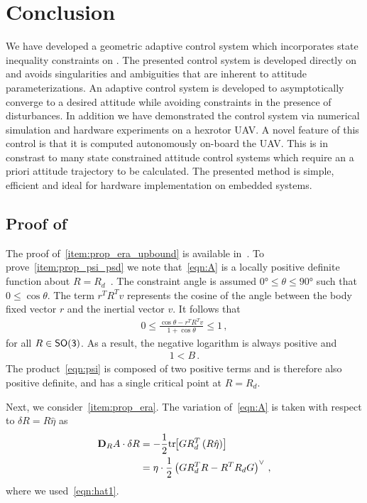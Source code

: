 \documentclass[letterpaper, 10 pt, conference]{ieeeconf}  %
\begin{document}
\section{Conclusion}\label{sec:conclusion}
We have developed a geometric adaptive control system which incorporates state inequality constraints on \SO.
The presented control system is developed directly on \SO and avoids singularities and ambiguities that are inherent to attitude parameterizations.
An adaptive control system is developed to asymptotically converge to a desired attitude while avoiding constraints in the presence of disturbances.
In addition we have demonstrated the control system via numerical simulation and hardware experiments on a hexrotor UAV.
A novel feature of this control is that it is computed autonomously on-board the UAV.
This is in constrast to many state constrained attitude control systems which require an a priori attitude trajectory to be calculated. 
The presented method is simple, efficient and ideal for hardware implementation on embedded systems.



\appendix
\subsection{Proof of~}\label{proof:config_error}
The proof of~\cref{item:prop_era_upbound} is available in~\cite{lee2011a}.
To prove~\cref{item:prop_psi_psd} we note that~\cref{eqn:A} is a locally positive definite function about \( R = R_d \)~\cite{bullo2004}.
The constraint angle is assumed \( \ang{0} \leq \theta \leq \ang{90} \) such that \( 0 \leq \cos \theta \).
The term \( r^T R^T v \) represents the cosine of the angle between the body fixed vector \( r \) and the inertial vector \( v \). 
It follows that
\begin{align*}
	0 \leq  \frac{\cos \theta -  r^T R^T v}{1 + \cos \theta} \leq 1 \, ,
\end{align*}
for all \( R \in \mathsf{SO(3)} \). 
As a result, the negative logarithm is always positive and
\begin{align*}
	1 < B \, .
\end{align*}
The product~\cref{eqn:psi} is composed of two positive terms and is therefore also positive definite, and has a single critical point at \( R = R_d \).

Next, we consider~\cref{item:prop_era}.
The variation of~\cref{eqn:A} is taken with respect to \( \delta R = R \hat \eta \) as
\begin{align*}
	\mathbf{D}_{R} A \cdot \delta R &= -\frac{1}{2} \mathrm{tr}\negthickspace\left[ G R_d^T \left( R \hat{\eta}\right) \right] \\
	&= \eta \cdot \frac{1}{2} \left( G R_d^T R - R^T R_d G\right)^\vee \, ,
\end{align*}
where we used~\cref{eqn:hat1}.
\end{document}
